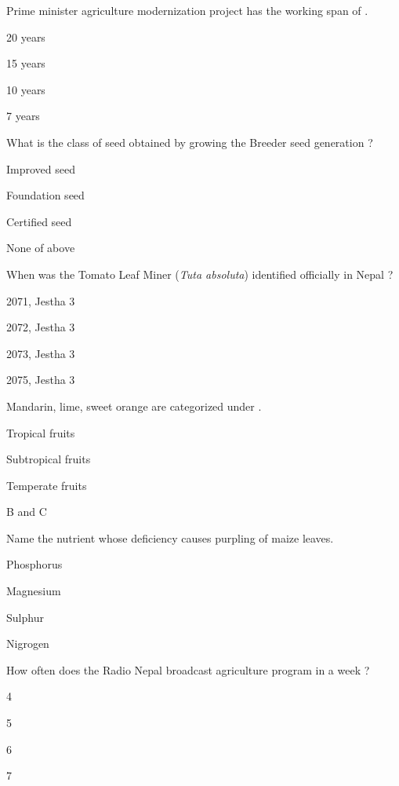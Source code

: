 \begin{questions}
\question Prime minister agriculture modernization project has the working span of \fillin[][3cm].
\begin{items}
\item 20 years
\item 15 years
\item* 10 years
\item 7 years
\end{items}

\question What is the class of seed obtained by growing the Breeder seed generation ?
\begin{items}
\item Improved seed
\item* Foundation seed
\item Certified seed
\item None of above
\end{items}

\question When was the Tomato Leaf Miner (\textit{Tuta absoluta}) identified officially in Nepal ?
\begin{items}
\item 2071, Jestha 3
\item 2072, Jestha 3
\item* 2073, Jestha 3
\item 2075, Jestha 3
\end{items}

\question Mandarin, lime, sweet orange are categorized under \fillin[][3cm].
\begin{items}
\item Tropical fruits
\item* Subtropical fruits
\item Temperate fruits
\item B and C
\end{items}

\question Name the nutrient whose deficiency causes purpling of maize leaves.
\begin{items}
\item* Phosphorus
\item Magnesium
\item Sulphur
\item Nigrogen
\end{items}

\question How often does the Radio Nepal broadcast agriculture program in a week ?
\begin{items}
\item 4
\item 5
\item 6
\item* 7
\end{items}


\end{questions}
